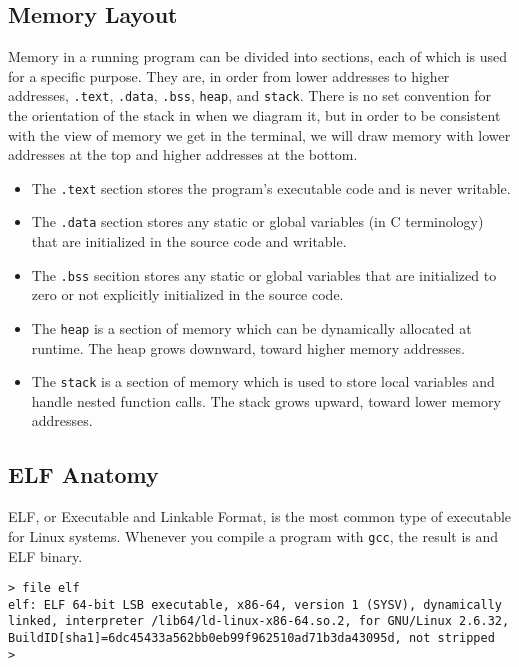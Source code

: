 \documentclass{article}
\begin{document}
\subsection{Memory Layout}
Memory in a running program can be divided into sections, each of which is used
for a specific purpose. They are, in order from lower addresses to higher
addresses, \texttt{.text}, \texttt{.data}, \texttt{.bss}, \texttt{heap}, and
\texttt{stack}. There is no set convention for the orientation of the stack in
when we diagram it, but in order to be consistent with the view of memory we get
in the terminal, we will draw memory with lower addresses at the top and higher
addresses at the bottom.

\begin{itemize}
    \item The \texttt{.text} section stores the program's executable code and is
never writable.
    \item The \texttt{.data} section stores any static or global variables (in C
terminology) that are initialized in the source code and writable.
    \item The \texttt{.bss} secition stores any static or global variables that
are initialized to zero or not explicitly initialized in the source code.
    \item The \texttt{heap} is a section of memory which can be dynamically
allocated at runtime. The heap grows downward, toward higher memory addresses.
    \item The \texttt{stack} is a section of memory which is used to store
local variables and handle nested function calls. The stack grows upward, toward
lower memory addresses.
\end{itemize}

\subsection{ELF Anatomy}
ELF, or Executable and Linkable Format, is the most common type of executable
for Linux systems. Whenever you compile a program with \texttt{gcc}, the result
is and ELF binary.

\begin{lstlisting}
> file elf
elf: ELF 64-bit LSB executable, x86-64, version 1 (SYSV), dynamically linked, interpreter /lib64/ld-linux-x86-64.so.2, for GNU/Linux 2.6.32, BuildID[sha1]=6dc45433a562bb0eb99f962510ad71b3da43095d, not stripped
> 
\end{lstlisting}
\end{document}
